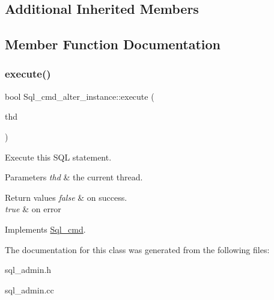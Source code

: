 \subsection*{Additional Inherited Members}


\subsection{Member Function Documentation}
\mbox{\label{classSql__cmd__alter__instance_a20c7c73bdbc58422a829474682fdf8c4}} 
\subsubsection{\texorpdfstring{execute()}{execute()}}
{\footnotesize\ttfamily bool Sql\+\_\+cmd\+\_\+alter\+\_\+instance\+::execute (\begin{DoxyParamCaption}\item[{T\+HD $\ast$}]{thd }\end{DoxyParamCaption})\hspace{0.3cm}{\ttfamily [virtual]}}

Execute this S\+QL statement. 
\begin{DoxyParams}{Parameters}
{\em thd} & the current thread. \\
\hline
\end{DoxyParams}

\begin{DoxyRetVals}{Return values}
{\em false} & on success. \\
\hline
{\em true} & on error \\
\hline
\end{DoxyRetVals}


Implements \mbox{\hyperlink{classSql__cmd_a213367b79b551296fbb7790f2a3732fb}{Sql\+\_\+cmd}}.



The documentation for this class was generated from the following files\+:\begin{DoxyCompactItemize}
\item 
sql\+\_\+admin.\+h\item 
sql\+\_\+admin.\+cc\end{DoxyCompactItemize}
